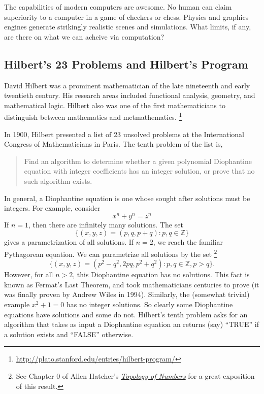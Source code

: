 \documentclass[english, 12pt]{article}
\begin{document}
  The capabilities of modern computers are awesome. No human can claim
  superiority to a computer in a game of checkers or chess. Physics and 
  graphics engines generate strikingly realistic scenes and simulations.
  What limits, if any, are there on what we can acheive via computation?
  \subsection{Hilbert's 23 Problems and Hilbert's Program}
  David Hilbert was a prominent mathematician of the late nineteenth and
  early twentieth century. His research areas included functional analysis,
  geometry, and mathematical logic. Hilbert also was one of the first
  mathematicians to distinguish between mathematics and metmathematics.
  \footnote{\url{http://plato.stanford.edu/entries/hilbert-program/}} \n

  In 1900, Hilbert presented a list of 23 unsolved problems at the
  International Congress of Mathematicians in Paris. The tenth problem
  of the list is,
  \begin{quote}
      Find an algorithm to determine whether a given polynomial Diophantine 
      equation with integer coefficients has an integer solution, or prove
      that no such algorithm exists.
  \end{quote}
  In general, a Diophantine equation is one whose sought after solutions must
  be integers. For example, consider
  \[ x^n + y^n = z^n \]
  If $n = 1$, then there are infinitely many solutions. The set 
  \[ \{(x, y, z) = (p, q, p + q) : p, q \in \mathbb{Z}\} \] gives a
  parametrization of all solutions. If $n = 2$, we reach the familiar
  Pythagorean equation. We can parametrize all solutions by the set
  \footnote{See Chapter 0 of Allen Hatcher's {\it 
  \href{http://www.math.cornell.edu/~hatcher/TN/TNpage.html}
       {Topology of Numbers} } for a great exposition of this result.}
  \[ \{ (x, y, z) = (p^2 - q^2, 2pq, p^2 + q^2) : p, q \in \mathbb{Z}, p > q
  \}. \]
  However, for all $n > 2$, this Diophantine equation has no solutions. This
  fact is known as Fermat's Last Theorem, and took mathematicians centuries
  to prove (it was finally proven by Andrew Wiles in 1994). Similarly, the
  (somewhat trivial) example \(x^2 + 1 = 0\) has no integer solutions. So 
  clearly some Diophantine equations have solutions and some do not.
  Hilbert's tenth problem asks for an algorithm that takes as input a 
  Diophantine equation an returns (say) ``TRUE'' if a solution exists and
  ``FALSE'' otherwise. \n
\end{document}
